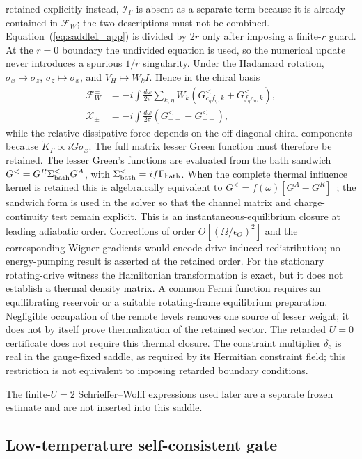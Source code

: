 \documentclass[%
  aps,physrev,onecolumn,10pt,amsmath,amssymb,superscriptaddress,longbibliography,floatfix
]{revtex4-2}
\begin{document}
retained explicitly instead, $\mathcal I_\Gamma$ is absent as a separate term
because it is already contained in $\mathcal F_W$; the two descriptions must
not be combined.
Equation~(\ref{eq:saddle1_app}) is divided by $2r$ only after imposing a
finite-$r$ guard.  At the $r=0$ boundary the undivided equation is used, so
the numerical update never introduces a spurious $1/r$ singularity.
Under the Hadamard rotation,
$\sigma_x\mapsto\sigma_z$, $\sigma_z\mapsto\sigma_x$, and
$V_H\mapsto W_kI$.  Hence in the chiral basis
\begin{align}
\mathcal F_W^\pm
&=-i\int\frac{d\omega}{2\pi}\sum_{k,\eta}W_k
\left(G_{c_\eta f_\eta,k}^<+G_{f_\eta c_\eta,k}^<\right),\\
\mathcal X_\pm
&=-i\int\frac{d\omega}{2\pi}(G_{++}^<-G_{--}^<),
\end{align}
while the relative dissipative force depends on the off-diagonal chiral
components because $\widetilde K_\Gamma\propto iG\sigma_x$.
The full matrix lesser Green function must therefore be retained.
The lesser Green's functions are evaluated from the bath sandwich
$G^<=G^R\Sigma_{\rm bath}^<G^A$, with
$\Sigma_{\rm bath}^<=if\Gamma_{\rm bath}$.  When the complete thermal
influence kernel is retained this is algebraically equivalent to
$G^<=f(\omega)[G^A-G^R]$~\cite{kamenev2023field}; the sandwich form is used
in the solver so that the channel matrix and charge-continuity test remain
explicit.  This is an instantaneous-equilibrium closure at leading
adiabatic order.  Corrections of order $O[(\Omega/\epsilon_O)^2]$ and the
corresponding Wigner gradients would encode drive-induced redistribution;
no energy-pumping result is asserted at the retained order.
For the stationary rotating-drive witness the Hamiltonian transformation
is exact, but it does not establish a thermal density matrix.  A common
Fermi function requires an equilibrating reservoir or a suitable
rotating-frame equilibrium preparation.  Negligible occupation of the
remote levels removes one source of lesser weight; it does not by itself
prove thermalization of the retained sector.  The retarded $U=0$ certificate
does not require this thermal closure.  The constraint multiplier
$\delta_c$ is real in the gauge-fixed saddle, as required by its Hermitian
constraint field; this restriction is not equivalent to imposing retarded
boundary conditions.

The finite-$U=2$ Schrieffer--Wolff expressions used later are a separate frozen estimate and are not inserted into this saddle.

\subsection{Low-temperature self-consistent gate}
\label{app:lowT_gate}
\end{document}
